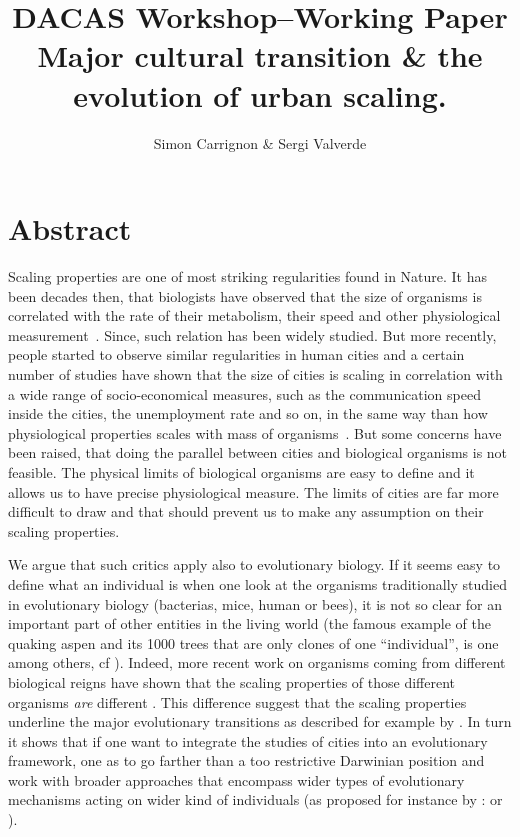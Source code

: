 \documentclass[a4paper,11pt]{article}
\title{DACAS Workshop--Working Paper\\
Major cultural transition \& the evolution of urban scaling.
}
\author{Simon Carrignon \& Sergi Valverde}
\date{}
\begin{document}
\maketitle

\section*{Abstract}
Scaling properties are one of most striking regularities found in Nature. It has been decades then, that biologists have observed that the size of organisms is correlated with the rate of their metabolism, their speed and other  physiological measurement~\citep{bonner2011size}. Since, such relation has been widely studied. But more recently, people started to observe similar regularities in human cities and a certain number of studies have shown that the size of cities is scaling in correlation with a wide range of socio-economical measures, such as the communication speed inside the cities, the unemployment rate and so on, in the same way than how physiological properties scales with mass of organisms~\citep{batty2008thesizescaleandshapeofcities,bettencourt2007growthinnovationscalingandthepaceoflifeincities}. 
But some concerns have been raised, that doing the parallel between cities and biological organisms is not feasible. The physical limits of biological organisms are easy to define and it allows us to have precise physiological measure. The limits of cities are far more difficult to draw and that should prevent us to make any assumption on their scaling properties. 

We argue that such critics apply also to evolutionary biology. If it seems easy to define what an individual is when one look at the organisms traditionally studied in evolutionary biology (bacterias, mice, human or bees), it is not so clear for an important part of other entities in the living world (the famous example of the quaking aspen and its 1000 trees that are only clones of one ``individual'', is one among others, cf \cite{bouchard2011darwinismwithoutpopulationsamoreinclusiveunderstandingofsotf}). Indeed, more recent work on organisms coming from different biological reigns have shown that the scaling properties of those different organisms \emph{are} different \citep{delong2010shiftsinmetabolicscalingproductionandefficiencyacrossmajorevolutionarytransitionsoflife}. This difference suggest that the scaling properties underline the major evolutionary transitions as described for example by \cite{maynardsmith1997major}. In turn it shows that if one want to integrate the studies of cities into an evolutionary framework, one as to go farther than a too restrictive Darwinian position and work with broader approaches that encompass wider types of evolutionary mechanisms acting on wider kind of individuals (as proposed for instance by : \cite{godfrey2009darwinian} or \cite{jablonka2014evolution}). 
\end{document}
